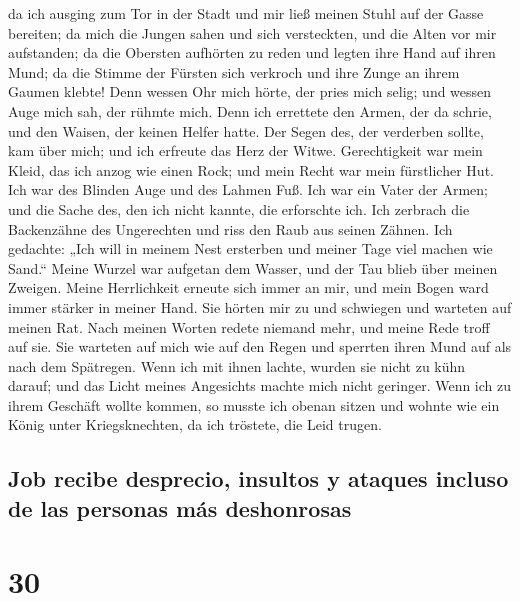 da ich ausging zum Tor in der Stadt und mir ließ meinen
Stuhl auf der Gasse bereiten;  da mich die Jungen sahen
und sich versteckten, und die Alten vor mir aufstanden; 
da die Obersten aufhörten zu reden und legten ihre Hand auf ihren Mund;
 da die Stimme der Fürsten sich verkroch und ihre Zunge
an ihrem Gaumen klebte!  Denn wessen Ohr mich hörte, der
pries mich selig; und wessen Auge mich sah, der rühmte mich.
 Denn ich errettete den Armen, der da schrie, und den
Waisen, der keinen Helfer hatte.  Der Segen des, der
verderben sollte, kam über mich; und ich erfreute das Herz der Witwe.
 Gerechtigkeit war mein Kleid, das ich anzog wie einen
Rock; und mein Recht war mein fürstlicher Hut.  Ich war
des Blinden Auge und des Lahmen Fuß.  Ich war ein Vater
der Armen; und die Sache des, den ich nicht kannte, die erforschte ich.
 Ich zerbrach die Backenzähne des Ungerechten und riss
den Raub aus seinen Zähnen.  Ich gedachte: „Ich will in
meinem Nest ersterben und meiner Tage viel machen wie Sand.``
 Meine Wurzel war aufgetan dem Wasser, und der Tau blieb
über meinen Zweigen.  Meine Herrlichkeit erneute sich
immer an mir, und mein Bogen ward immer stärker in meiner Hand.
 Sie hörten mir zu und schwiegen und warteten auf meinen
Rat.  Nach meinen Worten redete niemand mehr, und meine
Rede troff auf sie.  Sie warteten auf mich wie auf den
Regen und sperrten ihren Mund auf als nach dem Spätregen.
 Wenn ich mit ihnen lachte, wurden sie nicht zu kühn
darauf; und das Licht meines Angesichts machte mich nicht geringer.
 Wenn ich zu ihrem Geschäft wollte kommen, so musste ich
obenan sitzen und wohnte wie ein König unter Kriegsknechten, da ich
tröstete, die Leid trugen.

\hypertarget{job-recibe-desprecio-insultos-y-ataques-incluso-de-las-personas-muxe1s-deshonrosas}{%
\subsection{Job recibe desprecio, insultos y ataques incluso de las
personas más
deshonrosas}\label{job-recibe-desprecio-insultos-y-ataques-incluso-de-las-personas-muxe1s-deshonrosas}}

\hypertarget{section-29}{%
\section{30}\label{section-29}}

